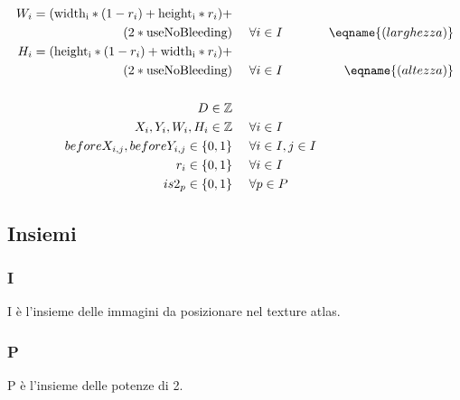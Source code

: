 \begin{align*}
%
W_i = (\text{\widthi}*(1-r_i) + \text{\heighti}*r_i)+ \ \ \ \ & &\\
(2*\text{useNoBleeding}) \ \ \ \ & \fori{} &\eqname{(larghezza)} \\
%
H_i = (\text{\heighti}*(1-r_i) + \text{\widthi}*r_i)+ \ \ \ \ & &\\
(2*\text{useNoBleeding}) \ \ \ \ & \fori{} &\eqname{(altezza)} \\
%
%
%
\\
D \in \IntegerSet \ \ \ \ & & \\
X_i, Y_i, W_i, H_i \in \IntegerSet      \ \ \ \ & \fori{} \\
beforeX_{i,j}, beforeY_{i,j} \in \BinSet    \ \ \ \ & \forall{i \in I,j \in I} \\
%
r_i \in \BinSet \ \ \ \ & \fori{} \\
%
is2_p \in \BinSet \ \ \ \ & \forall{p \in P} \\
%
 \end{align*}




\iffalse
Changelog del modello

Il modello è passato per più fasi incrementali:
* La prima versione risolve il problema base
* Quindi è stato aggiunto il supporto per il bleeding
* La terza versione ha aggiunto la possibilità di ruotare le immagini
* La quarta e ultima versione permette di fissare la dimensione della texture atlas a potenze di 2
\fi





\subsection{Insiemi}
\subsubsection{I}
I è l'insieme delle immagini da posizionare nel texture atlas.

\subsubsection{P}
P è l'insieme delle potenze di 2.






